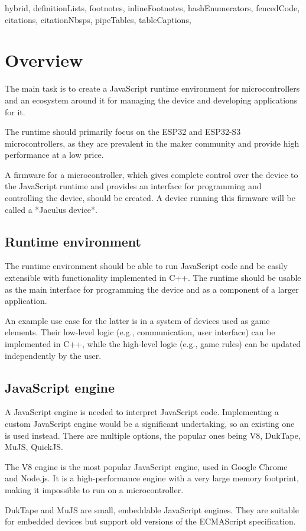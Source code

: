 \begin{markdown*}{%
  hybrid,
  definitionLists,
  footnotes,
  inlineFootnotes,
  hashEnumerators,
  fencedCode,
  citations,
  citationNbsps,
  pipeTables,
  tableCaptions,
}
\chapter{Overview}

The main task is to create a JavaScript runtime environment for microcontrollers and an ecosystem around it for managing the device and developing applications for it.

The runtime should primarily focus on the ESP32 and ESP32-S3 microcontrollers, as they are prevalent in the maker community and provide high performance at a low price.

A firmware for a microcontroller, which gives complete control over the device to the JavaScript runtime and provides an interface for programming and controlling the device, should be created. A device running this firmware will be called a *Jaculus device*.

\section{Runtime environment}

The runtime environment should be able to run JavaScript code and be easily extensible with functionality implemented in C++. The runtime should be usable as the main interface for programming the device and as a component of a larger application.

An example use case for the latter is in a system of devices used as game elements. Their low-level logic (e.g., communication, user interface) can be implemented in C++, while the high-level logic (e.g., game rules) can be updated independently by the user.

\section{JavaScript engine}

A JavaScript engine is needed to interpret JavaScript code. Implementing a custom JavaScript engine would be a significant undertaking, so an existing one is used instead. There are multiple options, the popular ones being V8, DukTape, MuJS, QuickJS.

The V8 engine is the most popular JavaScript engine, used in Google Chrome and Node.js. It is a high-performance engine with a very large memory footprint, making it impossible to run on a microcontroller.

DukTape and MuJS are small, embeddable JavaScript engines. They are suitable for embedded devices but support old versions of the ECMAScript specification.


\end{markdown*}
